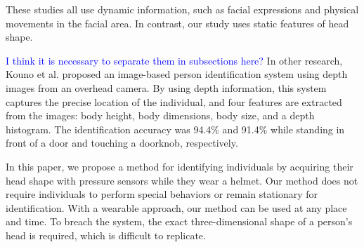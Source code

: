 \documentclass[sigchi,authordraft]{acmart}
\begin{document}
These studies all use dynamic information, such as facial expressions and physical movements in the facial area. In contrast, our study uses static features of head shape.\par

\textcolor{blue}{I think it is necessary to separate them in subsections here?}
In other research, Kouno et al. \cite{head_top_camera} proposed an image-based person identification system using depth images from an overhead camera. By using depth information, this system captures the precise location of the individual, and four features are extracted from the images: body height, body dimensions, body size, and a depth histogram. The identification accuracy was 94.4\% and 91.4\% while standing in front of a door and touching a doorknob, respectively.\par

In this paper, we propose a method for identifying individuals by acquiring their head shape with pressure sensors while they wear a helmet. Our method does not require individuals to perform special behaviors or remain stationary for identification. With a wearable approach, our method can be used at any place and time. To breach the system, the exact three-dimensional shape of a person's head is required, which is difficult to replicate.
\end{document}
